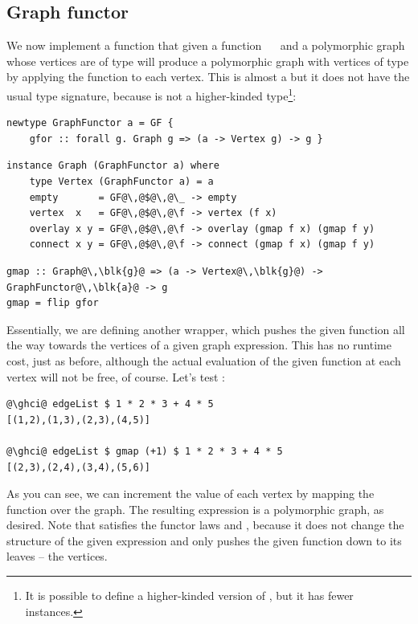 \subsection{Graph functor}\label{sub-functor}

We now implement a function  that given a function ~\hs{->}~
and a polymorphic graph whose vertices are of type  will produce a
polymorphic graph with vertices of type  by applying the function
to each vertex. This is almost a  but it does not have the usual
type signature, because  is not a higher-kinded type\footnote{It is
possible to define a higher-kinded version of , but it has
fewer instances.}:

\vspace{2mm}
\begin{verbatim}
newtype GraphFunctor a = GF {
    gfor :: forall g. Graph g => (a -> Vertex g) -> g }
\end{verbatim}
\vspace{1mm}
\begin{verbatim}
instance Graph (GraphFunctor a) where
    type Vertex (GraphFunctor a) = a
    empty       = GF@\,@$@\,@\_ -> empty
    vertex  x   = GF@\,@$@\,@\f -> vertex (f x)
    overlay x y = GF@\,@$@\,@\f -> overlay (gmap f x) (gmap f y)
    connect x y = GF@\,@$@\,@\f -> connect (gmap f x) (gmap f y)
\end{verbatim}
\vspace{1mm}
\begin{verbatim}
gmap :: Graph@\,\blk{g}@ => (a -> Vertex@\,\blk{g}@) -> GraphFunctor@\,\blk{a}@ -> g
gmap = flip gfor
\end{verbatim}

Essentially, we are defining another  wrapper, which pushes the
given function all the way towards the vertices of a given graph expression.
This has no runtime cost,
just as before, although the actual evaluation of the given function at each
vertex will not be free, of course. Let's test :

\begin{verbatim}
@\ghci@ edgeList $ 1 * 2 * 3 + 4 * 5
[(1,2),(1,3),(2,3),(4,5)]

@\ghci@ edgeList $ gmap (+1) $ 1 * 2 * 3 + 4 * 5
[(2,3),(2,4),(3,4),(5,6)]
\end{verbatim}
\vspace{-1mm}
As you can see, we can increment the value of each vertex by mapping the function
 over the graph. The resulting expression is a polymorphic graph, as desired.
Note that  satisfies the functor laws
 and , because
it does not change the structure of the given expression and only pushes
the given function down to its leaves -- the vertices.

